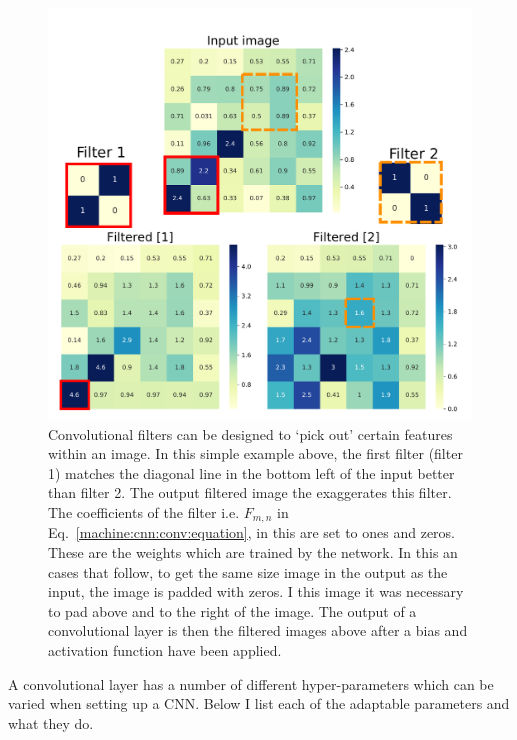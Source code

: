 \begin{figure}[p]

    \centering
    \includegraphics[width=\columnwidth]{C4_cnn/conv_filters.pdf}
    \caption[How convolutions are applied in convolutional neural networks.]{Convolutional filters can be designed to `pick out' certain features within an image. In this simple example above, the first filter (filter 1) matches the diagonal line in the bottom left of the input better than filter 2. The output filtered image the exaggerates this filter. The coefficients of the filter i.e. $F_{m,n}$ in Eq.~\ref{machine:cnn:conv:equation}, in this are set to ones and zeros.
    These are the weights which are trained by the network. In this an cases that follow, to get the same size image in the output as the input, the image is padded with zeros. I this image it was necessary to pad above and to the right of the image. The output of a convolutional layer is then the filtered images above after a bias and activation function have been applied. }
    \label{machine:cnn:convlayer:input}

\end{figure}

A convolutional layer has a number of different hyper-parameters which can be varied when setting up a \gls{CNN}.
Below I list each of the adaptable parameters and what they do.

